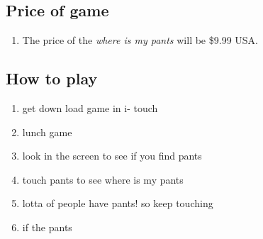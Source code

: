 \documentclass[twocolumn]{article}
\begin{document}
\subsection{Price of game}

\begin{enumerate}
\item The price of the {\it where is my pants} will be \$9.99 USA.
\end{enumerate}

\subsection{How to play}

\begin{enumerate}
\item get down load game in i- touch
\item lunch game
\item look in the screen to see if you find pants
\item touch pants to see where is my pants
\item lotta of people have pants! so keep touching
\item if the pants 
\end{enumerate}
\end{document}
